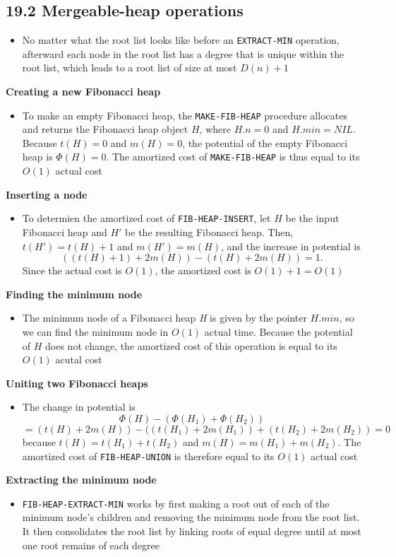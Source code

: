 \documentclass{report}
\begin{document}
\subsection*{19.2 Mergeable-heap operations}
\begin{itemize}
    \item No matter what the root list looks like before an \texttt{EXTRACT-MIN} operation, afterward each node in the root list has a degree that is unique within the root list, which leads to a root list of size at most $D(n) + 1$
\end{itemize}
\textbf{Creating a new Fibonacci heap}
\begin{itemize}
    \item To make an empty Fibonacci heap, the \texttt{MAKE-FIB-HEAP} procedure allocates and returns the Fibonacci heap object $H$, where $H.n = 0$ and $H.min = NIL$. Because $t(H) = 0$ and $m(H) = 0$, the potential of the empty Fibonacci heap is $\Phi(H) = 0$. The amortized cost of \texttt{MAKE-FIB-HEAP} is thus equal to its $O(1)$ actual cost
\end{itemize}
\textbf{Inserting a node}
\begin{itemize}
    \item To determien the amortized cost of \texttt{FIB-HEAP-INSERT}, let $H$ be the input Fibonacci heap and $H'$ be the resulting Fibonacci heap. Then, $t(H') = t(H) + 1$ and $m(H') = m(H)$, and the increase in potential is
    $$((t(H) + 1) + 2m(H)) - (t(H) + 2m(H)) = 1.$$
    Since the actual cost is $O(1)$, the amortized cost is $O(1) + 1 = O(1)$
\end{itemize}
\textbf{Finding the minimum node}
\begin{itemize}
    \item The minimum node of a Fibonacci heap \textit{H} is given by the pointer $H.min$, so we can find the minimum node in $O(1)$ actual time. Because the potential of $H$ does not change, the amortized cost of this operation is equal to its $O(1)$ acutal cost
\end{itemize}
\textbf{Uniting two Fibonacci heaps}
\begin{itemize}
    \item The change in potential is
    $$\Phi(H) - (\Phi(H_1) + \Phi(H_2))$$
    $$ = (t(H) + 2m(H)) - ((t(H_1) + 2m(H_1)) + (t(H_2) + 2m(H_2)) = 0$$
    because $t(H) = t(H_1) + t(H_2)$ and $m(H) = m(H_1) + m(H_2)$. The amortized cost of \texttt{FIB-HEAP-UNION} is therefore equal to its $O(1)$ actual cost
\end{itemize}
\textbf{Extracting the minimum node}
\begin{itemize}
    \item \texttt{FIB-HEAP-EXTRACT-MIN} works by first making a root out of each of the minimum node's children and removing the minimum node from the root list. It then consolidates the root list by linking roots of equal degree until at most one root remains of each degree
\end{itemize}
\end{document}
